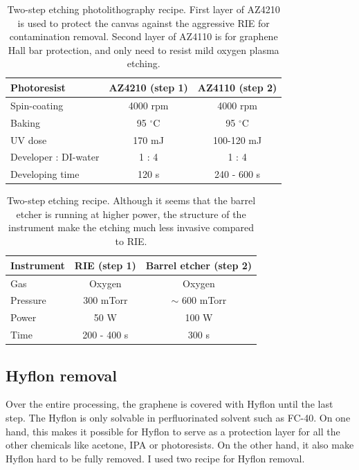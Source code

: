 \documentclass[pdflatex, sectionletters, 12pt]{pittetd}    %
\begin{document}
\begin{table}
	\centering
	\begin{tabular}{l|cc}
		\hline
		Photoresist	& AZ4210 (step 1) & AZ4110 (step 2) \\ \hline
		Spin-coating	&	4000 rpm	&	4000 rpm \\ 
		Baking	&	95 $^{\circ}$C	&	95 $^{\circ}$C	\\ 
		UV dose	&	170 mJ	&	100-120 mJ	\\
		Developer : DI-water	&	1 : 4 &	1 : 4 \\ 
		Developing time	&	120 s	&	240 - 600 s \\
		\hline
	\end{tabular}
	\caption{Two-step etching photolithography recipe. First layer of AZ4210 is used to protect the canvas against the aggressive RIE for contamination removal. Second layer of AZ4110 is for graphene Hall bar protection, and only need to resist mild oxygen plasma etching.}
	\label{TAB:TwoStepPL}
\end{table}

\begin{table}
	\centering
	\begin{tabular}{l|cc}
		\hline
		Instrument	& RIE (step 1)	&	Barrel etcher (step 2) \\ \hline
		Gas	&	Oxygen &	Oxygen \\ 
		Pressure	&	300 mTorr	&	$\sim$ 600 mTorr \\
		Power	&	50 W	&	100 W \\
		Time	&	200 - 400 s &	300 s\\ \hline
	\end{tabular}
	\caption{Two-step etching recipe. Although it seems that the barrel etcher is running at higher power, the structure of the instrument make the etching much less invasive compared to RIE.}
	\label{TAB:TwoStepEtching}
\end{table}

\subsection{Hyflon removal}

Over the entire processing, the graphene is covered with Hyflon until the last step. The Hyflon is only solvable in perfluorinated solvent such as FC-40. On one hand, this makes it possible for Hyflon to serve as a protection layer for all the other chemicals like acetone, IPA or photoresists. On the other hand, it also make Hyflon hard to be fully removed. I used two recipe for Hyflon removal. 
\end{document}
